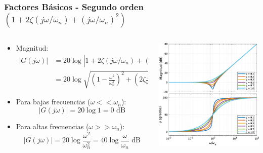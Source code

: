 \documentclass[aspectratio=169]{beamer}
\theoremstyle{definition}
\theoremstyle{plain}
\theoremstyle{remark}
\begin{document}
\begin{frame}[<+->]\frametitle{Factores Básicos - Segundo orden $(1+2\zeta(j\omega/\omega_n)+(j\omega/\omega_n)^2)$}
\begin{columns}
	\begin{column}{0.5\textwidth}
	\begin{itemize}
		\item Magnitud:
		\begin{align*}
			\left| G(j\omega) \right| &= 20 \log \left| 1+2\zeta(j\omega/\omega_n)+(j\omega/\omega_n)^2 \right|\\
			&= 20 \log \sqrt{\left(1-\frac{\omega^2}{\omega_n^2}\right)^2+\left(2\zeta\frac{\omega}{\omega_n}\right)^2}
		\end{align*}
		\item Para bajas frecuencias ($\omega << \omega_n$):
		\begin{equation*}
			\left| G(j\omega) \right| = 20 \log 1 = 0 \text{ dB}
		\end{equation*}
		\item Para altas frecuencias ($\omega >> \omega_n$):
		\begin{equation*}
			\left| G(j\omega) \right| = 20 \log \frac{\omega^2}{\omega_n^2} = 40 \log \frac{\omega}{\omega_n} \text{ dB}
		\end{equation*}
	\end{itemize}
	\end{column}
	\begin{column}{0.5\textwidth}
	\centering
	\includegraphics[width=6.5cm]{images/bodeSecondOrderDerivative.eps}
	\end{column}
\end{columns}
\end{frame}
\end{document}
